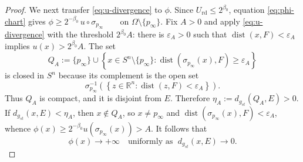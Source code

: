 \documentclass[12pt,oneside,a4paper]{article}
\theoremstyle{mytheorem}
\theoremstyle{remark}
\theoremstyle{definition}
\begin{document}
\begin{proof}
We next transfer \eqref{eq:u-divergence} to $\phi$.  Since
$U_{\mathrm{rd}}\le2^{\beta_0}$, equation \eqref{eq:phi-chart} gives
$\phi\ge2^{-\beta_0}\,u\circ\sigma_{p_\infty}
\qquad\text{on }\Omega\setminus\{p_\infty\}.$
Fix $A>0$ and apply \eqref{eq:u-divergence} with the threshold
$2^{\beta_0} A$: there is $\varepsilon_A>0$ such that
$\operatorname{dist}(x,F)<\varepsilon_A$ implies $u(x)>2^{\beta_0} A$.
The set
\[
 Q_A:=
 \{p_\infty\}\cup
 \left\{
 x\in S^n\setminus\{p_\infty\}:
 \operatorname{dist}(\sigma_{p_\infty}(x),F)\ge\varepsilon_A
 \right\}
\]
is closed in $S^n$ because its complement is the open set
\[
 \sigma_{p_\infty}^{-1}\!\left(
 \left\{z\in\mathbb R^n:\operatorname{dist}(z,F)<\varepsilon_A\right\}
 \right).
\]
Thus $Q_A$ is compact, and it is disjoint from $E$.  Therefore
$\eta_A:=d_{g_{st}}(Q_A,E)>0$.  If $d_{g_{st}}(x,E)<\eta_A$,
then $x\notin Q_A$, so $x\ne p_\infty$ and
$\operatorname{dist}(\sigma_{p_\infty}(x),F)<\varepsilon_A$, whence
$\phi(x)\ge2^{-\beta_0}u(\sigma_{p_\infty}(x))>A.$
It follows that
\begin{equation}\label{eq:phi-divergence}
 \phi(x)\longrightarrow+\infty
 \quad\text{uniformly as }\;
 d_{g_{st}}(x,E)\longrightarrow0.
\end{equation}


\end{proof}
\end{document}
